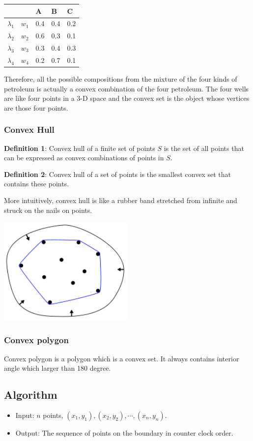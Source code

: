\documentclass[en,hazy,blue,screen,14pt]{elegantnote}
\begin{document}
\begin{table}[H]
\centering
\begin{tabular}{|l|l|l|l|l|}
\hline
            &       & A   & B   & C   \\ \hline
$\lambda_1$ & $w_1$ & 0.4 & 0.4 & 0.2 \\ \hline
$\lambda_2$ & $w_2$ & 0.6 & 0.3 & 0.1 \\ \hline
$\lambda_3$ & $w_3$ & 0.3 & 0.4 & 0.3 \\ \hline
$\lambda_4$ & $w_4$ & 0.2 & 0.7 & 0.1 \\ \hline
\end{tabular}
\end{table}
Therefore, all the possible compositions from the mixture of the four kinds of 
petroleum is actually a convex combination of the four petroleum. The four 
wells are like four points in a 3-D space and the convex set is the object 
whose vertices are those four points.

\subsubsection{Convex Hull}
\textbf{Definition 1}: Convex hull of a finite set of points $S$ is the set of 
all points that can be expressed as convex combinations of points in $S$. 

\textbf{Definition 2}: Convex hull of a set of points is the smallest convex 
set that contains these points.
 
More intuitively, convex hull is like a rubber band stretched from infinite and 
struck on the nails on points.
\centerline{\includegraphics[width=0.5\textwidth]{ConvexHull.png}}
\subsubsection{Convex polygon}
Convex polygon is a polygon which is a convex set. It always contains interior 
angle which larger than 180 degree.
\subsection{Algorithm}
\begin{itemize}
 \item Input: $n$ points, $(x_1, y_1), (x_2, y_2), \cdots, (x_n, y_n)$.
 \item Output: The sequence of points on the boundary in counter clock order.
\end{itemize}
\end{document}
